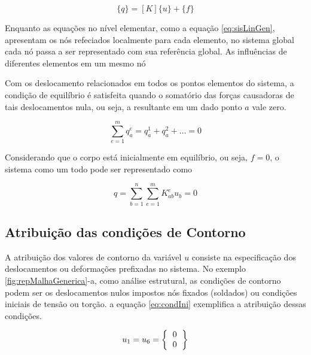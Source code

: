 \documentclass[
    12pt,               %
    openright,          %
    oneside,
    a4paper,            %
    english,            %
    french,             %
    spanish,            %
    brazil              %
    ]{abntex2}
\begin{document}
 \begin{equation}
 \label{eq:sisLinGen2}
    \{q\} = [K] \{u\} + \{f\}
 \end{equation}

Enquanto as equações no nível elementar, como a equação \ref{eq:sisLinGen}, apresentam os nós refeciados localmente para cada elemento, no sistema global cada nó passa a ser representado com sua referência global. As influências de diferentes elementos em um mesmo nó 
 
 Com os deslocamento relacionados em todos os pontos elementos do sistema,
 a condição de equilíbrio é satisfeita quando o somatório das forças causadoras de tais deslocamentos nula, ou seja, a resultante em um dado ponto $a$ vale zero.
 
  \begin{equation}
    \label{eq:somaForcas}
    \sum_{e=1}^{m}{q_a^e = q_a^1 + q_a^2 + \dots = 0}
  \end{equation}
  
  Considerando que o corpo está inicialmente em equilíbrio, ou seja, $f = 0$, o sistema como um todo pode ser representado como 
  
    \begin{equation}
        \label{eq:equilibrio}
        q =
        \sum_{b=1}^{n}\sum_{e=1}^{m}{K_{ab}^e u_b = 0}
    \end{equation}
    
    
\subsection{Atribuição das condições de Contorno}
A atribuição dos valores de contorno da variável $u$ consiste na especificação dos deslocamentos ou deformações prefixadas no sistema. No exemplo \ref{fig:repMalhaGenerica}-a, como análise estrutural, as condições de contorno podem ser os deslocamentos nulos impostos nós fixados (soldados) ou condições iniciais de tensão ou torção. a equação \ref{eq:condIni} exemplifica a atribuição dessas condições.

\begin{equation}
    \label{eq:condIni}
    u_1 = u_6 = 
        \left \{
        \begin{tabular}{c}
            $0$ \\
            $0$ \\
        \end{tabular}       
        \right \}   
\end{equation}
\end{document}
